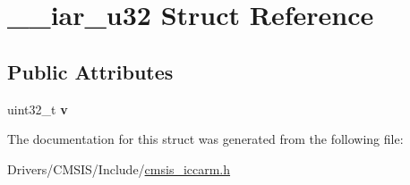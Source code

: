\hypertarget{struct____iar__u32}{}\section{\+\_\+\+\_\+iar\+\_\+u32 Struct Reference}
\label{struct____iar__u32}
\subsection*{Public Attributes}
\begin{DoxyCompactItemize}
\item 
\mbox{\label{struct____iar__u32_af8b16b2c629a3f2264c1af078ef2578a}} 
uint32\+\_\+t {\bfseries v}
\end{DoxyCompactItemize}


The documentation for this struct was generated from the following file\+:\begin{DoxyCompactItemize}
\item 
Drivers/\+C\+M\+S\+I\+S/\+Include/\mbox{\hyperlink{cmsis__iccarm_8h}{cmsis\+\_\+iccarm.\+h}}\end{DoxyCompactItemize}
